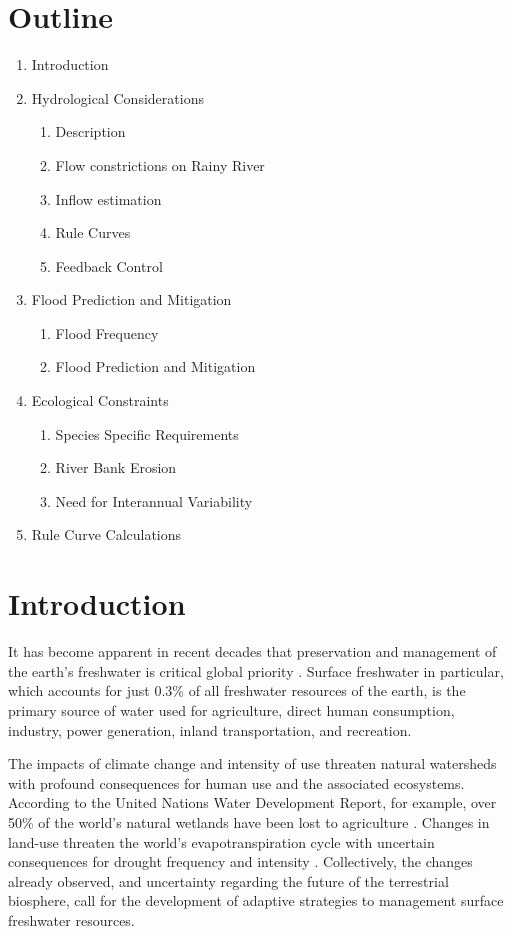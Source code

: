 \documentclass[preprint,times]{elsarticle}
\begin{document}
\section*{Outline}
\begin{enumerate}
    \item Introduction
    \item Hydrological Considerations
    \begin{enumerate}
        \item Description
        \item Flow constrictions on Rainy River
        \item Inflow estimation
        \item Rule Curves
        \item Feedback Control
    \end{enumerate}
    \item Flood Prediction and Mitigation
    \begin{enumerate}
        \item Flood Frequency
        \item Flood Prediction and Mitigation
    \end{enumerate}
    \item Ecological Constraints
    \begin{enumerate}
        \item Species Specific Requirements
        \item River Bank Erosion
        \item Need for Interannual Variability
    \end{enumerate}
    \item Rule Curve Calculations
\end{enumerate}

\section{Introduction}
\noindent

It has become apparent in recent decades that preservation and management of the earth's freshwater is critical global priority \cite{UN-water}. Surface freshwater in particular, which  accounts for just 0.3\% of all freshwater resources of the earth, is the primary source of water used for agriculture, direct human consumption, industry, power generation, inland transportation, and recreation. 

The impacts of climate change and intensity of use threaten natural watersheds with profound consequences for human use and the associated ecosystems. According to the United Nations Water Development Report, for example, over 50\% of the world's natural wetlands have been lost to agriculture \cite{wwap2003united,Verhoeven:2010aa}. Changes in land-use threaten the world's evapotranspiration cycle with uncertain consequences for drought frequency and intensity \cite{Fisher2017}. Collectively, the changes already observed, and uncertainty regarding the future of the terrestrial biosphere, call for the development of adaptive strategies to management surface freshwater resources.
\end{document}
